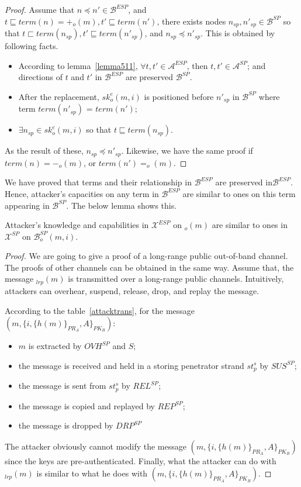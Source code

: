\begin{proof}
Assume that $n \preceq n' \in \mathcal{B}^{ESP}$, and $t \sqsubseteq term(n) = +_o(m), t' \sqsubseteq term(n')$,  there exists nodes $n_{sp},n'_{sp} \in \mathcal{B}^{SP}$ so that $t \sqsubset term(n_{sp}), t' \sqsubseteq term(n'_{sp})$, and $n_{sp} \preceq n'_{sp} $. This is obtained by following facts. 
\begin{itemize}
\item According to lemma~\ref{lemma511}, $\forall t,t' \in \mathcal{A}^{ESP}$, then $t,t' \in \mathcal{A}^{SP}$; and directions of $t$ and $t'$ in $\mathcal{B}^{ESP}$ are preserved $\mathcal{B}^{SP}$.
\item After the replacement, $sk^e_o(m,i)$ is positioned before $n'_{sp}$ in $\mathcal{B}^{SP}$ where term $term(n'_{sp})$ = $term(n')$;
\item $\exists n_{sp} \in sk^e_o(m,i)$ so that $t \sqsubseteq term(n_{sp})$. 
\end{itemize}

As the result of these, $n_{sp} \preceq n'_{sp}$. Likewise, we have the same proof if $term(n)=-_o(m)$, or $term(n')= _o(m)$.
\end{proof}

We have proved that terms and their relationship in $\mathcal{B}^{ESP}$ are preserved in$\mathcal{B}^{ESP}$. Hence, attacker's capacities on any term in $\mathcal{B}^{ESP}$ are similar to ones on this term appearing in $\mathcal{B}^{SP}$. The below lemma shows this. 

\begin{Lemma}\label{sameattack}
Attacker's knowledge and capabilities in $\mathcal{X}^{ESP}$ on $_o(m)$ are similar to ones in $\mathcal{X}^{SP}$ on $\mathcal{B}^{SP}_o(m,i)$. 
\end{Lemma}
\begin{proof}
We are going to give a proof of a long-range public out-of-band channel. The proofs of other channels can be obtained in the same way. Assume that, the message $_{lrp}(m)$ is transmitted over a long-range public channels. Intuitively, attackers can overhear, suspend, release, drop, and replay the message. 

According to the table~\ref{attacktrans}, for the message $(m, \{i,\{h(m)\}_{PR_A},A\}_{PK_B})$:
\begin{itemize}
\item $m$ is extracted by $OVH^{SP}$ and $S$;
\item the message is received and held in a storing penetrator strand $st^s_p$ by $SUS^{SP}$;
\item the message is sent from $st^s_p$ by $REL^{SP}$;
\item the message is copied and replayed by $REP^{SP}$;
\item the message is dropped by $DRP^{SP}$
\end{itemize}

The attacker obviously cannot modify the message $(m, \{i,\{h(m)\}_{PR_A},A\}_{PK_B})$ since the keys are pre-authenticated. Finally, what the attacker can do with $_{lrp}(m)$ is similar to what he does with $(m, \{i,\{h(m)\}_{PR_A},A\}_{PK_B})$.
\end{proof}

